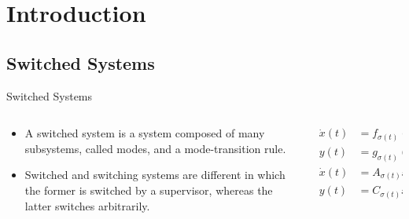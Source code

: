 
\section{Introduction}%
\label{sec:introduction}

\subsection{Switched Systems}%
\label{subsec:switched-systems}

\begin{slide}{Switched Systems}
  \begin{columns}[c]
    \begin{column}{0.48\textwidth}
      \begin{itemize}
        \item A switched system is a system composed of many subsystems, called
              modes, and a mode-transition rule.
        \item Switched and switching systems are different in which the former
              is switched by a supervisor, whereas the latter switches
              arbitrarily.
      \end{itemize}
    \end{column}%
    \hfill%
    \begin{column}{0.48\textwidth}
      \begin{equation}
        \begin{aligned}
          \dot{x}(t) & = f_{\sigma(t)}(t,x(t),u(t)), \\
          y(t)       & = g_{\sigma(t)}(t,x(t),u(t)),
        \end{aligned}
      \end{equation}
      \vspace*{0.5cm}
      \begin{equation}
        \begin{aligned}
          \dot{x}(t) & = A_{\sigma(t)}x(t) + B_{\sigma(t)}u(t), \\
          y(t)       & = C_{\sigma(t)}x(t) + D_{\sigma(t)}u(t).
        \end{aligned}
      \end{equation}
    \end{column}%
  \end{columns}
\end{slide}

